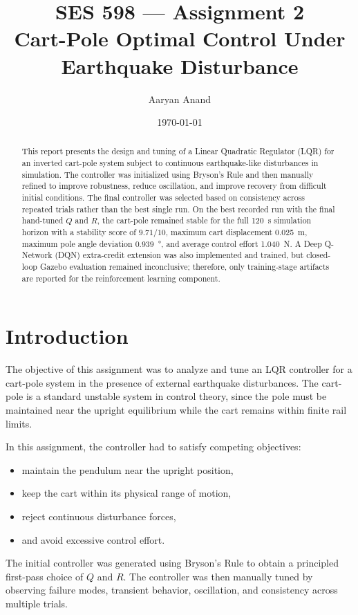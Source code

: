 \documentclass[11pt]{article}
\title{\textbf{SES 598 --- Assignment 2\\
Cart-Pole Optimal Control Under Earthquake Disturbance}}
\author{Aaryan Anand}
\date{\today}
\begin{document}
\maketitle

\begin{abstract}
This report presents the design and tuning of a Linear Quadratic Regulator (LQR) for an inverted cart-pole system subject to continuous earthquake-like disturbances in simulation. The controller was initialized using Bryson's Rule and then manually refined to improve robustness, reduce oscillation, and improve recovery from difficult initial conditions. The final controller was selected based on consistency across repeated trials rather than the best single run. On the best recorded run with the final hand-tuned $Q$ and $R$, the cart-pole remained stable for the full \SI{120}{s} simulation horizon with a stability score of $9.71/10$, maximum cart displacement \SI{0.025}{m}, maximum pole angle deviation \SI{0.939}{\degree}, and average control effort \SI{1.040}{N}. A Deep Q-Network (DQN) extra-credit extension was also implemented and trained, but closed-loop Gazebo evaluation remained inconclusive; therefore, only training-stage artifacts are reported for the reinforcement learning component.
\end{abstract}

\section{Introduction}
The objective of this assignment was to analyze and tune an LQR controller for a cart-pole system in the presence of external earthquake disturbances. The cart-pole is a standard unstable system in control theory, since the pole must be maintained near the upright equilibrium while the cart remains within finite rail limits.

In this assignment, the controller had to satisfy competing objectives:
\begin{itemize}[itemsep=2pt]
    \item maintain the pendulum near the upright position,
    \item keep the cart within its physical range of motion,
    \item reject continuous disturbance forces,
    \item and avoid excessive control effort.
\end{itemize}

The initial controller was generated using Bryson's Rule to obtain a principled first-pass choice of $Q$ and $R$. The controller was then manually tuned by observing failure modes, transient behavior, oscillation, and consistency across multiple trials.
\end{document}
